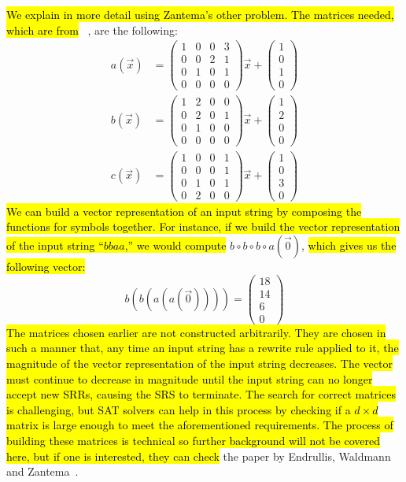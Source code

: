 \par
\hl{We explain in more detail using Zantema's other problem. The matrices needed, which are from} ~\cite{Hofbauer:2006:TA:1142725.1711178}, are the following:
\begin{align*}
a(\Vec{x}) &= \begin{pmatrix}
1&0&0&3\\
0&0&2&1\\
0&1&0&1\\
0&0&0&0
\end{pmatrix} \Vec{x} + \begin{pmatrix}
1\\
0\\
1\\
0
\end{pmatrix}\\
b(\Vec{x}) &= \begin{pmatrix}
1&2&0&0\\
0&2&0&1\\
0&1&0&0\\
0&0&0&0
\end{pmatrix} \Vec{x} + \begin{pmatrix}
1\\
2\\
0\\
0
\end{pmatrix}\\
c(\Vec{x}) &= \begin{pmatrix}
1&0&0&1\\
0&0&0&1\\
0&1&0&1\\
0&2&0&0
\end{pmatrix} \Vec{x} + \begin{pmatrix}
1\\
0\\
3\\
0
\end{pmatrix}
\end{align*}
\hl{We can build a vector representation of an input string by composing the functions for symbols together. For instance, if we build the vector representation of the input string ``$bbaa$,'' we would compute} $b \circ b \circ b \circ a (\Vec{0})$, \hl{which gives us the following vector:}
\[
b(b(a(a(\Vec{0}))))= \begin{pmatrix}
18\\14\\6\\0 \end{pmatrix}
\]
\hl{The matrices chosen earlier are not constructed arbitrarily. They are chosen in such a manner that, any time an input string has a rewrite rule applied to it, the magnitude of the vector representation of the input string decreases. The vector must continue to decrease in magnitude until the input string can no longer accept new SRRs, causing the SRS to terminate. The search for correct matrices is challenging, but SAT solvers can help in this process by checking if a $d \times d$ matrix is large enough to meet the aforementioned requirements. The process of building these matrices is technical so further background will not be covered here, but if one is interested, they can check} the paper by Endrullis, Waldmann and Zantema~\cite{Endrullis2006}.
